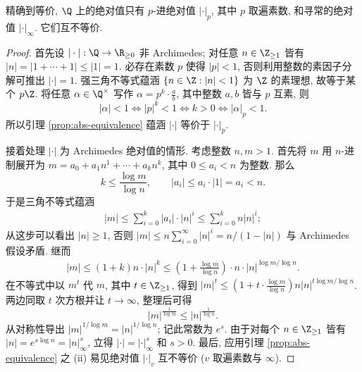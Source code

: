 \begin{theorem}[A.\ Ostrowski]\label{prop:abs-Q}
	精确到等价, $\Q$ 上的绝对值只有 $p$-进绝对值 $|\cdot|_p$, 其中 $p$ 取遍素数, 和寻常的绝对值 $|\cdot|_\infty$. 它们互不等价.
\end{theorem}
\begin{proof}
	首先设 $|\cdot|: \Q \to \R_{\geq 0}$ 非 Archimedes; 对任意 $n \in \Z_{\geq 1}$ 皆有 $|n| = |1 + \cdots + 1| \leq |1|=1$. 必存在素数 $p$ 使得 $|p|<1$, 否则利用整数的素因子分解可推出 $|\cdot|=1$. 强三角不等式蕴涵 $\{n \in \Z: |n| < 1 \}$ 为 $\Z$ 的素理想, 故等于某个 $p\Z$. 将任意 $\alpha \in \Q^\times$ 写作 $\alpha = p^k \cdot \frac{a}{b}$, 其中整数 $a, b$ 皆与 $p$ 互素, 则
	\[ |\alpha| < 1 \iff |p|^k < 1 \iff k > 0 \iff |\alpha|_p < 1.\]
	所以引理 \ref{prop:abs-equivalence} 蕴涵 $|\cdot|$ 等价于 $|\cdot|_p$.
	
	接着处理 $|\cdot|$ 为 Archimedes 绝对值的情形. 考虑整数 $n, m > 1$. 首先将 $m$ 用 $n$-进制展开为 $m = a_0 + a_1 n^1 + \cdots + a_k n^k$, 其中 $0 \leq a_i < n$ 为整数. 那么
	\[ k \leq \frac{\log m}{\log n}, \qquad |a_i| \leq a_i \cdot |1| = a_i < n. \]
	于是三角不等式蕴涵
	\begin{gather*}
		|m| \leq \sum_{i=0}^k |a_i| \cdot |n|^i \leq \sum_{i=0}^k n |n|^i;
	\end{gather*}
	从这步可以看出 $|n| \geq 1$, 否则 $|m| \leq n \sum_{i=0}^\infty |n|^i = n/(1-|n|)$ 与 Archimedes 假设矛盾. 继而
	\begin{gather*}
		|m| \leq (1+k) n \cdot |n|^k \leq \left( 1 + \frac{\log m}{\log n} \right) \cdot n \cdot |n|^{\log m/\log n}.
	\end{gather*}
	在不等式中以 $m^t$ 代 $m$, 其中 $t \in \Z_{\geq 1}$, 得到 $|m|^t \leq \left( 1 + t \cdot \frac{\log m}{\log n} \right) n |n|^{t \log m/\log n}$. 两边同取 $t$ 次方根并让 $t \to \infty$, 整理后可得
	\[ |m|^{\frac{1}{\log m}} \leq |n|^{\frac{1}{\log n}}. \]
	从对称性导出 $|m|^{1/\log m} = |n|^{1/\log n}$; 记此常数为 $e^s$. 由于对每个 $n \in \Z_{\geq 1}$ 皆有 $|n|=e^{s \log n} = |n|_\infty^s$, 立得 $|\cdot| = |\cdot|_\infty^s$ 和 $s > 0$. 最后, 应用引理 \ref{prop:abs-equivalence} 之 (ii) 易见绝对值 $|\cdot|_v$ 互不等价 ($v$ 取遍素数与 $\infty$).
\end{proof}

